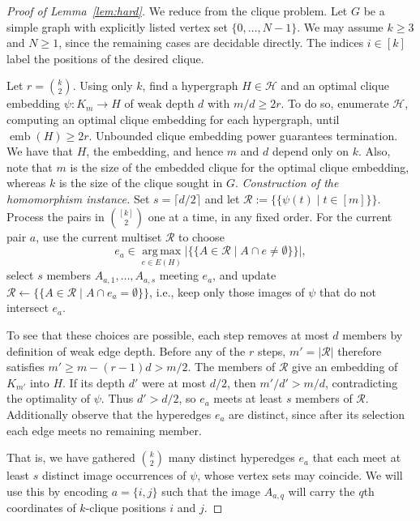 \documentclass[11pt,letterpaper]{article}
\theoremstyle{definition}
\theoremstyle{remark}
\newcommand{\cH}{\mathcal H}
\newcommand{\emb}{\operatorname{emb}}
\begin{document}
\begin{proof}[Proof of Lemma~\ref{lem:hard}]
We reduce from the clique problem. Let $G$ be a simple graph with explicitly
listed vertex set $\{0,\ldots,N-1\}$. We may assume $k\ge3$ and $N\ge1$, since
the remaining cases are decidable directly. The indices $i\in[k]$
label the positions of the desired clique.

Let $r=\binom{k}{2}$. Using only $k$, find a hypergraph $H\in\cH$
and an optimal clique embedding $\psi:K_m\to H$ of weak depth $d$
with $m/d\ge2r$. To do so, enumerate $\cH$, computing an optimal
clique embedding for each hypergraph, until $\emb(H)\ge2r$. Unbounded clique
embedding power guarantees termination. We have that $H$, the embedding,
and hence $m$ and $d$ depend only on $k$. Also, note that $m$ is the size of the
embedded clique for the optimal clique embedding, whereas $k$ is the size of the clique sought in $G$.
%
%
%
%
\smallskip\textit{Construction of the homomorphism instance.}
Set $s=\lceil d/2\rceil$ and let
\(
 \mathcal R:=\{\!\{\psi(t)\mid t\in[m]\}\!\}.
\)
Process the pairs in $\binom{[k]}{2}$ one at a time, in any fixed order.
For the current pair $a$, use the current multiset $\mathcal R$ to choose
\[
 e_a\in\operatorname*{arg\,max}_{e\in E(H)}
 \bigl|\{\!\{A\in\mathcal R\mid A\cap e\ne\emptyset\}\!\}\bigr|,
\]
select $s$ members $A_{a,1},\ldots,A_{a,s}$ meeting $e_a$, and update
\(
 \mathcal R\leftarrow
 \{\!\{A\in\mathcal R\mid A\cap e_a=\emptyset\}\!\}
\), i.e., keep only those images of $\psi$ that do not intersect $e_a$.

To see that these choices are possible, each step removes at most $d$
members by definition of weak edge depth. Before any of the $r$ steps, $m'=|\mathcal R|$ therefore satisfies
\(
 m'\ge m-(r-1)d>m/2.
\)
The members of $\mathcal R$ give an embedding of $K_{m'}$ into $H$. If its depth $d'$
were at most $d/2$, then $m'/d'>m/d$, contradicting the optimality
of $\psi$. Thus $d'>d/2$, so $e_a$ meets at least $s$ members of
$\mathcal R$. Additionally observe that the  hyperedges $e_a$ are distinct, since after
its selection each edge meets no remaining member.

That is, we have gathered $\binom{k}{2}$ many distinct hyperedges $e_a$ that each meet at least $s$ distinct image occurrences of $\psi$, whose vertex sets may coincide. We will use this by encoding $a=\{i,j\}$ such that  the image $A_{a,q}$ will carry the $q$th coordinates of $k$-clique positions $i$ and $j$.


\end{proof}
\end{document}
